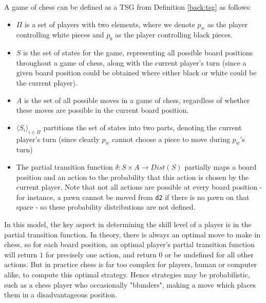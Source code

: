 \begin{example}
\label{back:chess}

    A game of chess can be defined as a TSG from Definition \ref{back:tsg} as follows:

    \begin{itemize}
        \item $\Pi$ is a set of players with two elements, where we denote $p_w$ as the player controlling white pieces and $p_b$ as the player controlling black pieces.
        \item $S$ is the set of states for the game, representing all possible board positions throughout a game of chess, along with the current player's turn (since a given board position could be obtained where either black or white could be the current player).
        \item $A$ is the set of all possible moves in a game of chess, regardless of whether these moves are possible in the current board position.
        \item $\langle S_i \rangle_{i \in \Pi}$ partitions the set of states into two parts, denoting the current player's turn (since clearly $p_w$ cannot choose a piece to move during $p_w$'s turn)
        \item The partial transition function $\delta : S \times A \rightarrow Dist(S)$ partially maps a board position and an action to the probability that this action is chosen by the current player. Note that not all actions are possible at every board position - for instance, a pawn cannot be moved from \texttt{d2} if there is no pawn on that space - so these probability distributions are not defined.
    \end{itemize}

    In this model, the key aspect in determining the skill level of a player is in the partial transition function. In theory, there is always an optimal move to make in chess, so for each board position, an optimal player's partial transition function will return $1$ for precisely one action, and return $0$ or be undefined for all other actions. But in practice chess is far too complex for players, human or computer alike, to compute this optimal strategy. Hence strategies may be probabilistic, such as a chess player who occasionally "blunders", making a move which places them in a disadvantageous position.

\end{example}






